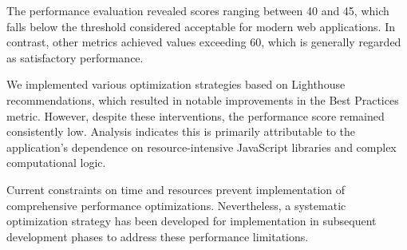 \noindent The performance evaluation revealed scores ranging between 40 and 45, which falls below the threshold considered acceptable for modern web applications. In contrast, other metrics achieved values exceeding 60, which is generally regarded as satisfactory performance.

We implemented various optimization strategies based on Lighthouse recommendations, which resulted in notable improvements in the Best Practices metric. However, despite these interventions, the performance score remained consistently low. Analysis indicates this is primarily attributable to the application's dependence on resource-intensive JavaScript libraries and complex computational logic.

Current constraints on time and resources prevent implementation of comprehensive performance optimizations. Nevertheless, a systematic optimization strategy has been developed for implementation in subsequent development phases to address these performance limitations.

